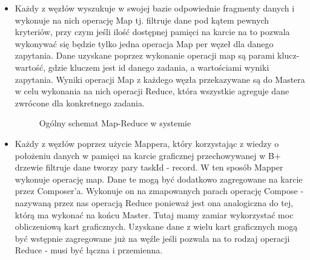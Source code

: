 \documentclass[paper=a4, fontsize=11pt]{scrartcl} %
\numberwithin{equation}{section} %
\numberwithin{figure}{section} %
\numberwithin{table}{section} %
\begin{document}
\begin{itemize}
	\item Każdy z węzłów wyszukuje w swojej bazie odpowiednie fragmenty danych i wykonuje na nich operację Map tj. filtruje dane pod kątem pewnych 
		kryteriów, przy czym jeśli ilość dostępnej pamięci na karcie na to pozwala wykonywać się będzie tylko jedna operacja Map per węzeł dla danego zapytania.
		Dane uzyskane poprzez wykonanie operacji map są parami klucz-wartość, gdzie kluczem jest id danego zadania, a wartościami wyniki zapytania. Wyniki
		operacji Map z każdego węzła przekazywane są do Mastera w celu wykonania na nich operacji Reduce, która wszystkie agreguje dane zwrócone dla konkretnego zadania. 
		\begin{figure}[t]
			\begin{center}
				\caption{Ogólny schemat Map-Reduce w systemie}
			\end{center}
		\end{figure}
	\item Każdy z węzłów poprzez użycie Mappera, który korzystając z wiedzy o położeniu danych w pamięci na karcie graficznej przechowywanej w B+ drzewie filtruje dane tworzy
		pary taskId - record. W ten sposób Mapper wykonuje operację map. Dane te mogą być dodatkowo zagregowane na karcie przez Composer'a. Wykonuje on na zmapowanych
		parach operację Compose - nazywaną przez nas operacją Reduce ponieważ jest ona analogiczna do tej, którą ma wykonać na końcu Master. Tutaj mamy zamiar wykorzystać
		moc obliczeniową kart graficznych. Uzyskane dane z wielu kart graficznych mogą być wstępnie zagregowane już na węźle jeśli pozwala na to rodzaj operacji Reduce - musi być łączna i przemienna.

\end{itemize}
\end{document}
